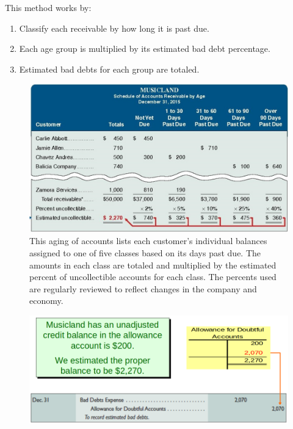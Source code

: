 \documentclass[../main.tex]{subfiles}
\begin{document}
	 This method works by:
	 \begin{enumerate}[noitemsep]
	 	\item Classify each receivable by how long it is past due.
	 	\item Each age group is multiplied by its estimated bad debt percentage.
	 	\item Estimated bad debts for each group are totaled.
	 \end{enumerate}
	
	\begin{figure}[ht]
		\centering
		\includegraphics[width=\columnwidth]{images/c6/aging_receivables_eg.png}
		\caption{This aging of accounts lists each customer’s individual 
		balances assigned to one of five classes based on its days past due. 
		The amounts in each class are totaled and multiplied by the estimated 
		percent of uncollectible accounts for each class. The percents used are 
		regularly reviewed to reflect changes in the company and economy.}
	\end{figure}
	
	
	\begin{figure}[ht]
		\centering
		\includegraphics[width=\columnwidth]{images/c6/aging_eg2.png}
	\end{figure}
	
\end{document}
